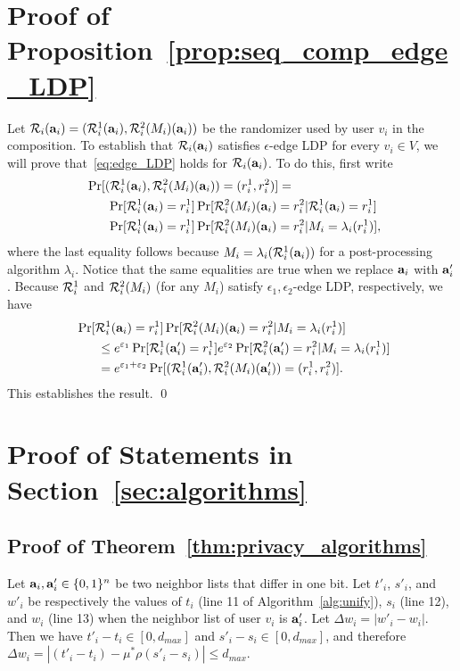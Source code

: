 {\section{Proof of Proposition~\ref{prop:seq_comp_edge_LDP}}
\label{sec:proof_seq_comp_edge_LDP}
Let $\mathcal{R}_i(\mathbf{a}_i) = (\mathcal{R}_i^1(\mathbf{a}_i), \mathcal{R}_i^2(M_i)(\mathbf{a}_i))$ be the
randomizer used by user $v_i$ in the composition. To establish that
$\mathcal{R}_i(\mathbf{a}_i)$ satisfies $\epsilon$-edge LDP for every $v_i \in V$, we will
prove that~\eqref{eq:edge_LDP} holds for $\mathcal{R}_i(\mathbf{a}_i)$. To do this, first write
\begin{align*}
  &\;\Pr[(\mathcal{R}_i^1(\mathbf{a}_i), \mathcal{R}_i^2(M_i)(\mathbf{a}_i)) = (r_i^1, r_i^2)] = \\
  &\qquad\Pr[\mathcal{R}_i^1(\mathbf{a}_i) = r_i^1]\Pr[\mathcal{R}_i^2(M_i)(\mathbf{a}_i) = r_i^2 | \mathcal{R}_i^1(\mathbf{a}_i) = r_i^1] \\
  &\qquad\Pr[\mathcal{R}_i^1(\mathbf{a}_i) = r_i^1]\Pr[\mathcal{R}_i^2(M_i)(\mathbf{a}_i) = r_i^2 | M_i = \lambda_i(r_i^1)],
\end{align*}
where the last equality follows because $M_i = \lambda_i(\mathcal{R}_i^1(\mathbf{a}_i))$ for a post-processing algorithm $\lambda_i$.
Notice that the same equalities are true when we replace $\mathbf{a}_i$ with $\mathbf{a}_i'$.
Because $\mathcal{R}_i^1$ and $\mathcal{R}_i^2(M_i)$ (for any $M_i$) satisfy $\epsilon_1, \epsilon_2$-edge LDP, respectively,
we have
\begin{align*}
  &\;\Pr[\mathcal{R}_i^1(\mathbf{a}_i) = r_i^1]\Pr[\mathcal{R}_i^2(M_i)(\mathbf{a}_i) = r_i^2 | M_i = \lambda_i(r_i^1)] \\
  &\qquad\leq e^{\varepsilon_1}\Pr[\mathcal{R}_i^1(\mathbf{a}_i') = r_i^1]e^{\varepsilon_2}\Pr[\mathcal{R}_i^2(\mathbf{a}_i') = r_i^2 | M_i = \lambda_i(r_i^1)] \\
  &\qquad= e^{\varepsilon_1 + \varepsilon_2} \Pr[(\mathcal{R}_i^1(\mathbf{a}_i'), \mathcal{R}_i^2(M_i)(\mathbf{a}_i')) = (r_i^1, r_i^2)].
\end{align*}
This establishes the result. \qed

\section{Proof of Statements in Section~\ref{sec:algorithms}}
\label{sec:proof_algorithms}
\subsection{Proof of Theorem~\ref{thm:privacy_algorithms}}
Let $\mathbf{a}_i, \mathbf{a}'_i \in \{0,1\}^n$ be two neighbor lists that differ in one bit.
Let $t'_i$, $s'_i$, and $w'_i$ be respectively the values of $t_i$ (line 11 of Algorithm~\ref{alg:unify}), $s_i$ (line 12), and $w_i$ (line 13) when the neighbor list of user $v_i$ is $\mathbf{a}'_i$.
Let $\Delta w_i = |w'_i - w_i|$.
Then we have $t'_i - t_i \in [0,d_{max}]$ and $s'_i - s_i \in [0,d_{max}]$, and therefore $\Delta w_i = |(t'_i - t_i) - \mu^* \rho(s'_i - s_i)| \leq d_{max}$.

}
